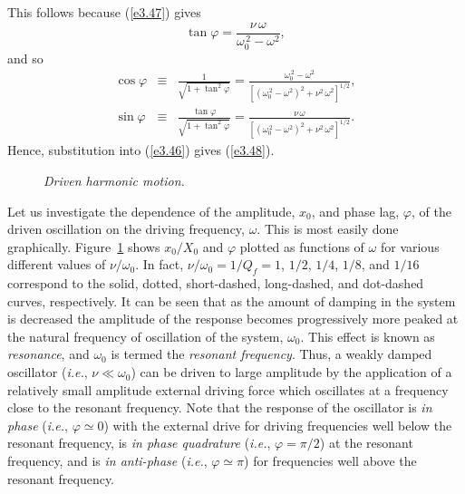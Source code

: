 This follows because (\ref{e3.47}) gives
\begin{equation}
\tan\varphi = \frac{\nu\,\omega}{\omega_0^{\,2}-\omega^2},
\end{equation}
and so
\begin{eqnarray}
\cos\varphi &\equiv & \frac{1}{\sqrt{1+\tan^2\varphi}} = \frac{\omega_0^{\,2}-\omega^2}{\left[(\omega_0^{\,2}-\omega^2)^2+\nu^2\,\omega^2\right]^{1/2}},\\[0.5ex]
\sin\varphi &\equiv &\frac{\tan\varphi}{\sqrt{1+\tan^2\varphi}} = \frac{\nu\,\omega}{\left[(\omega_0^{\,2}-\omega^2)^2+\nu^2\,\omega^2\right]^{1/2}}.\label{e3.49x}
\end{eqnarray}
Hence, substitution into (\ref{e3.46}) gives (\ref{e3.48}).

\begin{figure}
\epsfysize=2.25in
\centerline{}
\caption{\em Driven harmonic motion.}\label{f3.04}   
\end{figure}

Let us investigate the dependence of  the amplitude, $x_0$, and phase lag, $\varphi$, of the driven oscillation on the driving frequency,
$\omega$.  This is most easily done graphically. Figure~\ref{f3.04} shows $x_0/X_0$ and $\varphi$ plotted as functions of $\omega$ for
various different values of $\nu/\omega_0$. In fact, $\nu/\omega_0 = 1/Q_f= 1$, $1/2$, $1/4$, $1/8$, and $1/16$ correspond to the solid, dotted, short-dashed, long-dashed,
and dot-dashed curves, respectively. It can be seen that as the amount of
damping in the system is decreased the amplitude of the response becomes
progressively more peaked at the natural frequency of oscillation of the system, $\omega_0$. This effect is known as {\em resonance}, and
$\omega_0$ is termed the {\em resonant frequency}. Thus,
a weakly damped oscillator ({\em i.e.}, $\nu\ll \omega_0$) can be driven to large amplitude by the application of a relatively
small amplitude external driving force which oscillates at a frequency close to the resonant frequency. Note that the response of the oscillator is {\em in phase}\/ ({\em i.e.}, $\varphi\simeq 0$)
with the external drive for driving frequencies well below the resonant
frequency, is {\em in phase quadrature}\/
({\em i.e.}, $\varphi=\pi/2$)
at the resonant frequency, and is {\em in anti-phase}\/ ({\em i.e.}, $\varphi\simeq \pi$)
for frequencies well above the resonant frequency.

